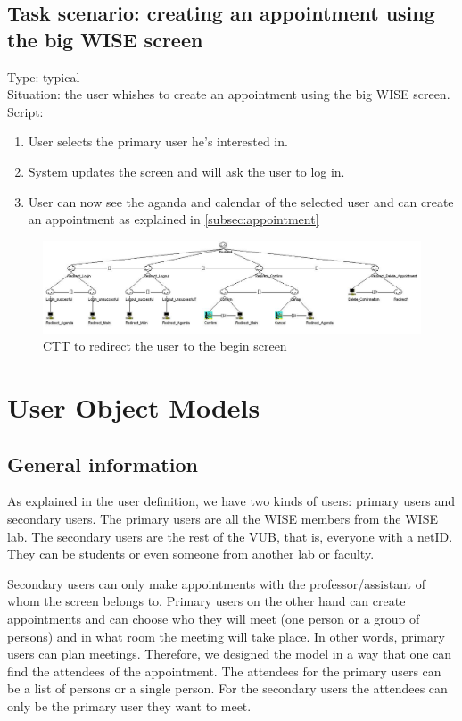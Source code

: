 \documentclass[11pt, a4paper,svglistings]{report}
\begin{document}
\subsection{Task scenario: creating an appointment using the big WISE screen}


Type: typical \\
Situation: the user whishes to create an appointment using the big WISE screen. \\
Script:
\begin{enumerate}
\item User selects the primary user he's interested in.
\item System updates the screen and will ask the user to log in.
\item User can now see the aganda and calendar of the selected user and can create an appointment as explained in \ref{subsec:appointment}
\end{enumerate}

\begin{figure}[H]
\centering
    \includegraphics[width=1\textwidth]{Redirect.jpg}
  \caption[Redirect CTT]{\label{fig:CreateAppointment}CTT to redirect the user to the begin screen}
\end{figure}


\section{User Object Models}

\subsection{General information}

As explained in the user definition, we have two kinds of users: primary users and secondary users. The primary users are all the WISE members from the WISE lab. The secondary users are the rest of the VUB, that is, everyone with a netID. They can be students or even someone from another lab or faculty.

Secondary users can only make appointments with the professor/assistant of whom the screen belongs to. Primary users on the other hand can create appointments and can choose who they will meet (one person or a group of persons) and in what room the meeting will take place. In other words, primary users can plan meetings. 
Therefore, we designed the model in a way that one can find the attendees of the appointment. The attendees for the primary users can be a list of persons or a single person. For the secondary users the attendees can only be the primary user they want to meet.
\end{document}
